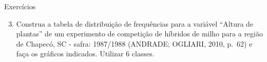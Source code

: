 \documentclass[
  ignorenonframetext,
]{beamer}
\providecommand{\tightlist}{%
  \setlength{\itemsep}{0pt}\setlength{\parskip}{0pt}}\usepackage{longtable,booktabs,array}
\begin{document}
\begin{frame}{Exercícios}
\label{exercuxedcios-2}
\begin{enumerate}
\setcounter{enumi}{2}
\tightlist
\item
  Construa a tabela de distribuição de frequências para a variável
  ``Altura de plantas'' de um experimento de competição de híbridos de
  milho para a região de Chapecó, SC - safra: 1987/1988 (ANDRADE;
  OGLIARI, 2010, p.~62) e faça os gráficos indicados. Utilizar 6
  classes.
\end{enumerate}
\end{frame}
\end{document}
